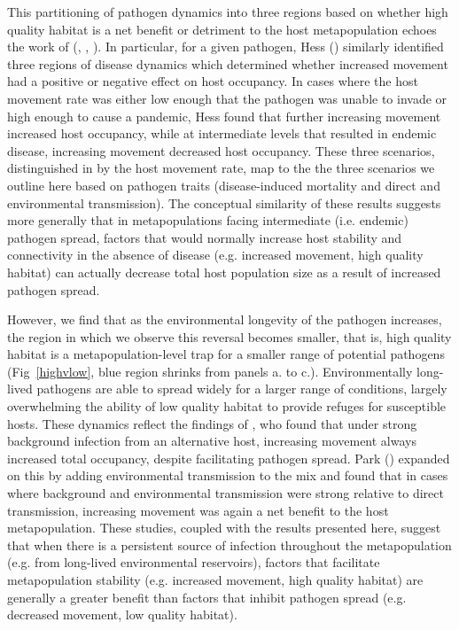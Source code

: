 \documentclass{article}
\begin{document}
This partitioning of pathogen dynamics into three regions based on whether high quality habitat is a net benefit or detriment to the host metapopulation echoes the work of (\cite{Hess1996}, \cite{Gog2002}, \cite{Park2012}).
In particular, for a given pathogen, Hess (\cite{Hess1996}) similarly identified three regions of disease dynamics which determined whether increased movement had a positive or negative effect on host occupancy.  
In cases where the host movement rate was either low enough that the pathogen was unable to invade or high enough to cause a pandemic, Hess found that further increasing movement increased host occupancy, while at intermediate levels that resulted in endemic disease, increasing movement decreased host occupancy.
These three scenarios, distinguished in \cite{Hess1996} by the host movement rate, map to the the three scenarios we outline here based on pathogen traits (disease-induced mortality and direct and environmental transmission).
The conceptual similarity of these results suggests more generally that in metapopulations facing intermediate (i.e. endemic) pathogen spread, factors that would normally increase host stability and connectivity in the absence of disease (e.g. increased movement, high quality habitat) can actually decrease total host population size as a result of increased pathogen spread.

However, we find that as the environmental longevity of the pathogen increases, the region in which we observe this reversal becomes smaller, that is, high quality habitat is a metapopulation-level trap for a smaller range of potential pathogens (Fig~\ref{highvlow}, blue region shrinks from panels a. to c.).  
Environmentally long-lived pathogens are able to spread widely for a larger range of conditions, largely overwhelming the ability of low quality habitat to provide refuges for susceptible hosts. 
These dynamics reflect the findings of \cite{Gog2002}, who found that under strong background infection from an alternative host, increasing movement always increased total occupancy, despite facilitating pathogen spread.  
Park (\cite{Park2012}) expanded on this by adding environmental transmission to the mix and found that in cases where background and environmental transmission were strong relative to direct transmission, increasing movement was again a net benefit to the host metapopulation.  
These studies, coupled with the results presented here, suggest that when there is a persistent source of infection throughout the metapopulation (e.g. from long-lived environmental reservoirs), factors that facilitate metapopulation stability (e.g. increased movement, high quality habitat) are generally a greater benefit than factors that inhibit pathogen spread (e.g. decreased movement, low quality habitat). 
\end{document}
